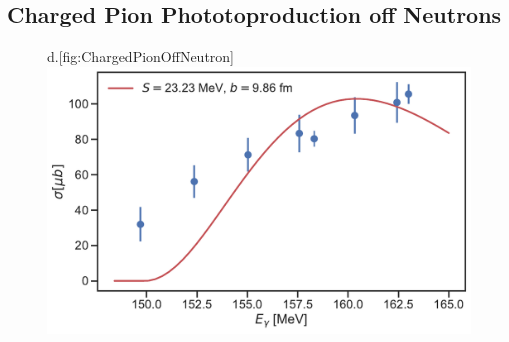 \subsection{Charged Pion Phototoproduction off Neutrons}
\begin{figure}[H]
	\begin{sidecaption}{d.}[fig:ChargedPionOffNeutron]
		\includegraphics[width=\linewidth]{Figures/ChargedPionOffNeutron.pdf}
	\end{sidecaption}
\end{figure}
\printbibliography